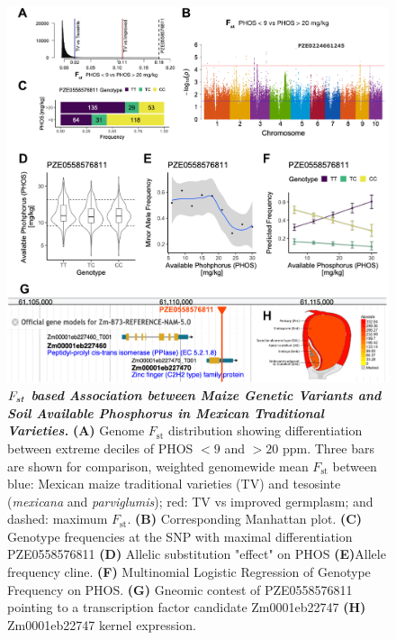 \begin{figure}[!ht]
\centering
\includegraphics[width=\linewidth]{Chapter-2/figs/PHOS_Fst.png}
\caption[Fst based Association between Maize Genetic Variants and Soil Available Phosphorus in Mexican Traditional Varieties]{\textit{\textbf{ $\boldmath{F_{st}}$ based Association between Maize Genetic Variants and Soil Available Phosphorus in Mexican Traditional Varieties.}}
\textbf{(A)} Genome $F_\text{st}$ distribution   showing differentiation between extreme deciles of PHOS $<9$ and $>20$ ppm. Three bars are shown for comparison, weighted genomewide mean $F_\text{st}$ \citep{hufford2013-gs} between blue: Mexican maize traditional varieties (TV) and tesosinte (\textit{mexicana} and \textit{parviglumis});  red: TV vs improved germplasm; and dashed: maximum $F_\text{st}$.
\textbf{(B)} Corresponding Manhattan plot.
\textbf{(C)} Genotype frequencies at the SNP with maximal differentiation PZE0558576811
\textbf{(D)} Allelic substitution "effect" on PHOS \textbf{(E)}Allele frequency cline.
\textbf{(F)} Multinomial Logistic Regression of Genotype Frequency on PHOS.
\textbf{(G)} Gneomic contest of PZE0558576811 pointing to a transcription factor candidate  Zm0001eb22747 \textbf{(H)} Zm0001eb22747 kernel expression.
 }
\label{fig::PHOS_Fst}
\end{figure}
\clearpage


\printbibliography[heading=subbibnumbered, title=References]